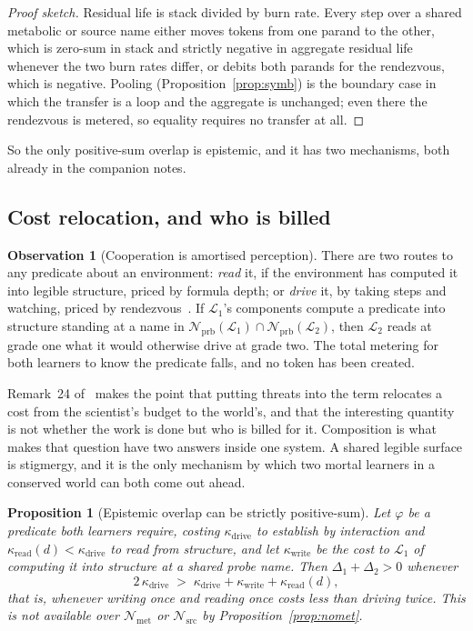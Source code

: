 \documentclass[11pt,a4paper]{article}
\theoremstyle{plain}
\newtheorem{proposition}[theorem]{Proposition}
\theoremstyle{definition}
\newtheorem{observation}[theorem]{Observation}
\theoremstyle{remark}
\newcommand{\Lrn}{\mathcal{L}}
\newcommand{\Nsp}{\mathcal{N}}
\newcommand{\Met}{\Nsp_{\mathrm{met}}}
\newcommand{\Src}{\Nsp_{\mathrm{src}}}
\newcommand{\Prb}{\Nsp_{\mathrm{prb}}}
\begin{document}
\begin{proof}[Proof sketch]
Residual life is stack divided by burn rate. Every step over a shared metabolic or source name
either moves tokens from one parand to the other, which is zero-sum in stack and strictly
negative in aggregate residual life whenever the two burn rates differ, or debits both parands
for the rendezvous, which is negative. Pooling (Proposition~\ref{prop:symb}) is the boundary case
in which the transfer is a loop and the aggregate is unchanged; even there the rendezvous is
metered, so equality requires no transfer at all.
\end{proof}

So the only positive-sum overlap is epistemic, and it has two mechanisms, both already in the
companion notes.

\subsection{Cost relocation, and who is billed}

\begin{observation}[Cooperation is amortised perception]\label{obs:amort}
There are two routes to any predicate about an environment: \emph{read} it, if the environment
has computed it into legible structure, priced by formula depth; or \emph{drive} it, by taking
steps and watching, priced by rendezvous~\cite[\S5.1]{game}. If $\Lrn_1$'s components compute a
predicate into structure standing at a name in $\Prb(\Lrn_1) \cap \Prb(\Lrn_2)$, then $\Lrn_2$
reads at grade one what it would otherwise drive at grade two. The total metering for both
learners to know the predicate falls, and no token has been created.
\end{observation}

Remark~24 of~\cite{game} makes the point that putting threats into the term relocates a cost from
the scientist's budget to the world's, and that the interesting quantity is not whether the work
is done but who is billed for it. Composition is what makes that question have two answers
inside one system. A shared legible surface is stigmergy, and it is the only mechanism by which
two mortal learners in a conserved world can both come out ahead.

\begin{proposition}[Epistemic overlap can be strictly positive-sum]
Let $\varphi$ be a predicate both learners require, costing $\kappa_{\mathrm{drive}}$ to
establish by interaction and $\kappa_{\mathrm{read}}(d) < \kappa_{\mathrm{drive}}$ to read from
structure, and let $\kappa_{\mathrm{write}}$ be the cost to $\Lrn_1$ of computing it into
structure at a shared probe name. Then $\Delta_1 + \Delta_2 > 0$ whenever
\[
  2\,\kappa_{\mathrm{drive}} \;>\; \kappa_{\mathrm{drive}} + \kappa_{\mathrm{write}} +
  \kappa_{\mathrm{read}}(d),
\]
that is, whenever writing once and reading once costs less than driving twice. This is not
available over $\Met$ or $\Src$ by Proposition~\ref{prop:nomet}.
\end{proposition}
\end{document}
